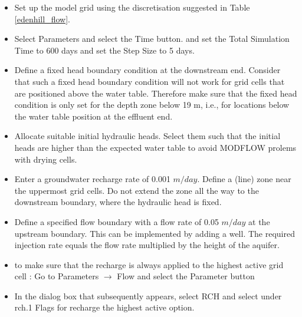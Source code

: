\begin{itemize} 

\item Set up the model grid using the discretisation 
suggested in Table \ref{edenhill_flow}.

\item Select {\color{blue}Parameters} and select the {\color{blue}Time} button.
and set the {\color{blue}Total Simulation Time} to 600 days and set
the {\color{blue}Step Size} to 5 days. 

\item Define a fixed head boundary condition at the downstream end. Consider that 
such a fixed head boundary condition will not work for grid cells that are positioned above the water table.
Therefore make sure that the fixed head condition is only set for the depth zone below 19 m, 
i.e., for locations below the water table position at the effluent end.

\item Allocate suitable initial hydraulic heads. Select them such that the initial heads 
are higher than the expected water table to avoid MODFLOW prolems with drying cells.

\item Enter a groundwater recharge rate of 0.001 $m/day$.
Define a (line) zone near the uppermost grid cells. Do not extend the zone 
all the way to the downstream boundary, where the hydraulic head is fixed. 

\item Define a specified flow boundary with a flow rate of 0.05 $m/day$ at the upstream boundary. 
This can be implemented by adding a well. The required injection rate equals
the flow rate multiplied by the height of the aquifer.

\item to make sure that the recharge is always applied to the highest active grid cell : 
Go to {\color{blue}Parameters} $\rightarrow$ {\color{blue}Flow} and select the {\color{blue}Parameter} button

\item In the dialog box that subsequently appears, select {\color{blue}RCH} and select under {\color{blue}rch.1 Flags for recharge} the {\color{blue}highest active} option.



\end{itemize}
